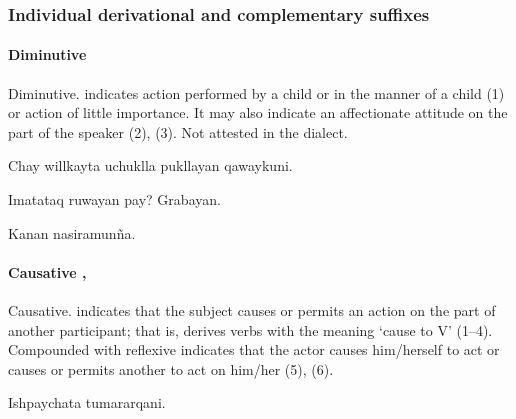 \subsubsection{Individual derivational and complementary suffixes}\label{ssec:IDCA}
\paragraph{Diminutive }
Diminutive.  indicates action performed by a child or in the manner of a child (1) or action of little importance. It may also indicate an affectionate attitude on the part of the speaker (2), (3). Not attested in the \CH{} dialect.

%
{Chay willkayta uchuklla pukllayan qawaykuni.}%
{}%
{}{}%

%
{\textquestiondown{}Imatataq ruwayan pay? Grabayan.}%
{}%
{}{}%

%
{Kanan nasiramun\~na.}%
{}%
{}{}%

\paragraph{Causative , }
Causative.  indicates that the subject causes or permits an action on the part of another participant; that is,  derives verbs with the meaning `cause to V' (1--4). Compounded with reflexive   indicates that the actor causes him/herself to act or causes or permits another to act on him/her (5), (6).

%
{Ishpaychata tumararqani.}%
{}%
{}{}%

